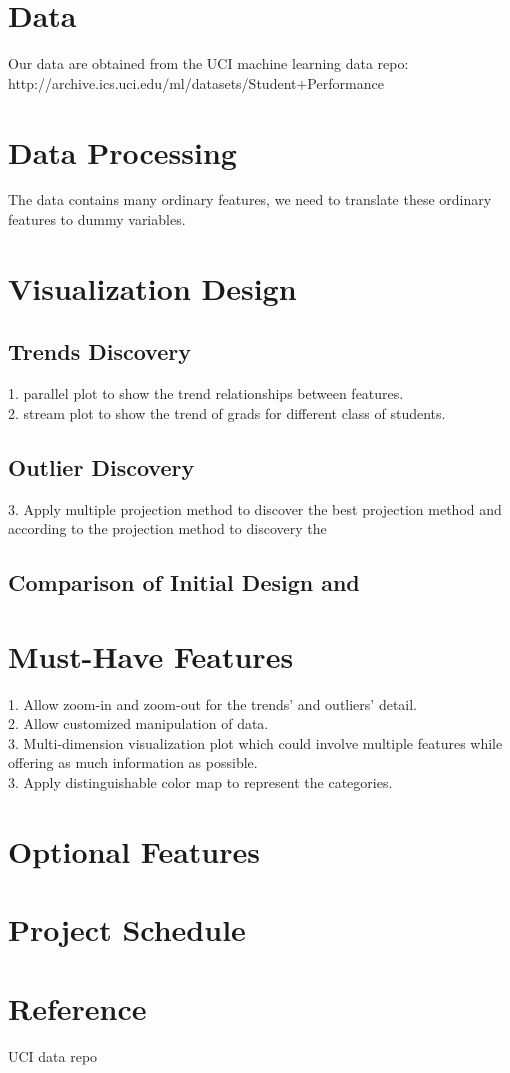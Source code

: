 \documentclass{article}
\begin{document}
\section{Data}
Our data are obtained from the UCI machine learning data repo: \\
http://archive.ics.uci.edu/ml/datasets/Student+Performance
\section{Data Processing}
The data contains many ordinary features, we need to translate these ordinary features to dummy variables.
\section{Visualization Design}
\subsection{Trends Discovery}
1. parallel plot to show the trend relationships between features. \\
2. stream plot to show the trend of grads for different class of students.
\subsection{Outlier Discovery}
3. Apply multiple projection method to discover the best projection method and according to the projection method to discovery the 
\subsection{Comparison of Initial Design and}
\section{Must-Have Features}
1. Allow zoom-in and zoom-out for the trends' and outliers' detail. \\
2. Allow customized manipulation of data. \\ 
3. Multi-dimension visualization plot which could involve multiple features while offering as much information as possible. \\
3. Apply distinguishable color map to represent the categories. \\
\section{Optional Features}
\section{Project Schedule}
\section{Reference}
UCI data repo
\end{document}
